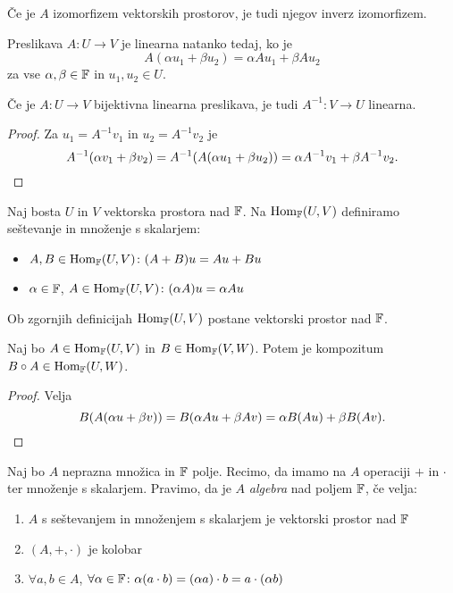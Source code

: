 \documentclass[12pt, a4paper]{article}
\begin{document}
\begin{opomba}
Če je $A$ izomorfizem vektorskih prostorov, je tudi njegov inverz izomorfizem.
\end{opomba}

\begin{trditev}
Preslikava $A\colon U\to V$ je linearna natanko tedaj, ko je
\[
A(\alpha u_1+\beta u_2)=\alpha Au_1+\beta Au_2
\]
za vse $\alpha,\beta\in\mathbb{F}$ in $u_1,u_2\in U$.
\end{trditev}

\obvs

\begin{trditev}
Če je $A\colon U\to V$ bijektivna linearna preslikava, je tudi $A^{-1}\colon V\to U$ linearna.
\end{trditev}

\begin{proof}
Za $u_1=A^{-1}v_1$ in $u_2=A^{-1}v_2$ je
\[
A^{-1}(\alpha v_1+\beta v_2)=A^{-1}(A(\alpha u_1+\beta u_2))=\alpha A^{-1}v_1+\beta A^{-1}v_2.\qedhere
\]
\end{proof}

\begin{definicija}
Naj bosta $U$ in $V$ vektorska prostora nad $\mathbb{F}$. Na $\operatorname{Hom}_{\mathbb{F}}(U,V)$ definiramo seštevanje in množenje s skalarjem:

\begin{itemize}
\item $A,B\in\operatorname{Hom}_{\mathbb{F}}(U,V)\colon (A+B)u=Au+Bu$
\item $\alpha\in\mathbb{F}$, $A\in\operatorname{Hom}_{\mathbb{F}}(U,V)\colon (\alpha A)u=\alpha Au$
\end{itemize}
\end{definicija}

\begin{trditev}
Ob zgornjih definicijah $\operatorname{Hom}_{\mathbb{F}}(U,V)$ postane vektorski prostor nad $\mathbb{F}$.
\end{trditev}

\obvs

\begin{trditev}\label{td:komp}
Naj bo $A\in\operatorname{Hom}_{\mathbb{F}}(U,V)$ in $B\in\operatorname{Hom}_{\mathbb{F}}(V,W)$. Potem je kompozitum $B\circ A\in\operatorname{Hom}_{\mathbb{F}}(U,W)$.
\end{trditev}

\begin{proof}
Velja
\[
B(A(\alpha u+\beta v))=B(\alpha Au+\beta Av)=\alpha B(Au)+\beta B(Av).\qedhere
\]
\end{proof}

\begin{definicija}
Naj bo $A$ neprazna množica in $\mathbb{F}$ polje. Recimo, da imamo na $A$ operaciji $+$ in $\cdot$ ter množenje s skalarjem. Pravimo, da je $A$ \emph{algebra} nad poljem $\mathbb{F}$, če velja:

\begin{enumerate}[label=\roman*)]
\item $A$ s seštevanjem in množenjem s skalarjem je vektorski prostor nad $\mathbb{F}$
\item $(A,+,\cdot)$ je kolobar
\item $\forall a,b\in A$, $\forall\alpha\in\mathbb{F}\colon \alpha(a\cdot b)=(\alpha a)\cdot b=a\cdot(\alpha b)$
\end{enumerate}
\end{definicija}
\end{document}

